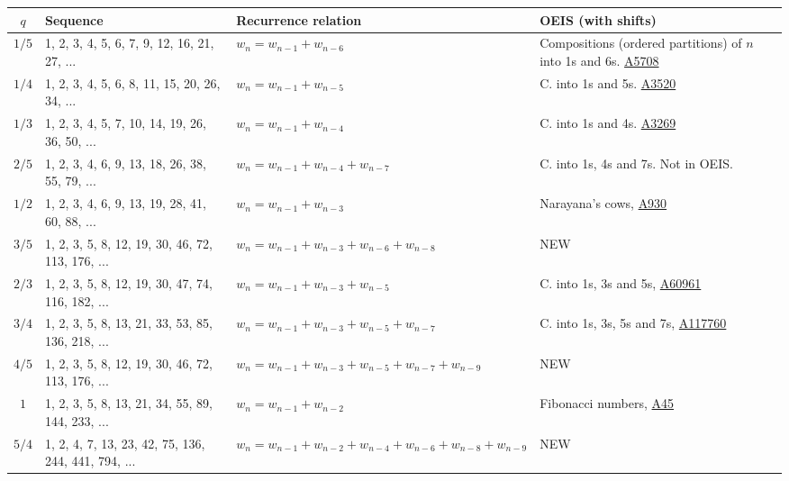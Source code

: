 \documentclass[a4paper,12pt]{article}
\theoremstyle{definition}
\newcommand\oeis[1]{\href{https://oeis.org/#1}{#1}}
\begin{document}
\begin{table}[ht]
  \scriptsize
  \hspace*{-5em}\begin{tabular}{c|l|l|p{9em}} $q$ & Sequence &
    Recurrence relation & OEIS (with shifts)\\ \hline $1/5$ & 1, 2, 3,
    4, 5, 6, 7, 9, 12, 16, 21, 27, ... & $w_n = w_{n-1} + w_{n-6}$ &
    Compositions (ordered partitions) of $n$ into 1s and 6s.
    \oeis{A5708} \\
    
    $1/4$ & 1, 2, 3, 4, 5, 6, 8, 11, 15, 20, 26, 34, ... & $w_n =
    w_{n-1} + w_{n-5}$ & C. into 1s and 5s.  \oeis{A3520} \\
    
    $1/3$ & 1, 2, 3, 4, 5, 7, 10, 14, 19, 26, 36, 50, ... & $w_n =
    w_{n-1} + w_{n-4}$ & C. into 1s and 4s.  \oeis{A3269} \\

    $2/5$ & 1, 2, 3, 4, 6, 9, 13, 18, 26, 38, 55, 79, ... & $w_n =
    w_{n-1} + w_{n-4} + w_{n-7}$ & C. into 1s, 4s and 7s. Not in OEIS.
    \\
    
    $1/2$ & 1, 2, 3, 4, 6, 9, 13, 19, 28, 41, 60, 88, ... & $w_n =
    w_{n-1} + w_{n-3}$ & Narayana's cows, \oeis{A930}\\

    $3/5$ & 1, 2, 3, 5, 8, 12, 19, 30, 46, 72, 113, 176, ... & $w_n =
    w_{n-1} + w_{n-3} + w_{n-6} + w_{n-8}$ & NEW \\
    
    $2/3$ & 1, 2, 3, 5, 8, 12, 19, 30, 47, 74, 116, 182, ... & $w_n =
    w_{n-1} + w_{n-3} + w_{n-5}$ & C. into 1s, 3s and 5s,
    \oeis{A60961} \\

    $3/4$ & 1, 2, 3, 5, 8, 13, 21, 33, 53, 85, 136, 218, ... & $w_n =
    w_{n-1} + w_{n-3} + w_{n-5} + w_{n-7}$ & C. into 1s, 3s, 5s and
    7s, \oeis{A117760} \\

    $4/5$ & 1, 2, 3, 5, 8, 12, 19, 30, 46, 72, 113, 176, ... & $w_n =
    w_{n-1} + w_{n-3} + w_{n-5} + w_{n-7} + w_{n-9}$ & NEW \\

    $1$ & 1, 2, 3, 5, 8, 13, 21, 34, 55, 89, 144, 233, ... & $w_n =
    w_{n-1} + w_{n-2}$ & Fibonacci numbers, \oeis{A45} \\

    $5/4$ & 1, 2, 4, 7, 13, 23, 42, 75, 136, 244, 441, 794, ... & $w_n
    = w_{n-1} + w_{n-2} + w_{n-4} + w_{n-6} + w_{n-8} + w_{n-9} $ &
    NEW \\


\end{tabular}
\end{table}
\end{document}
